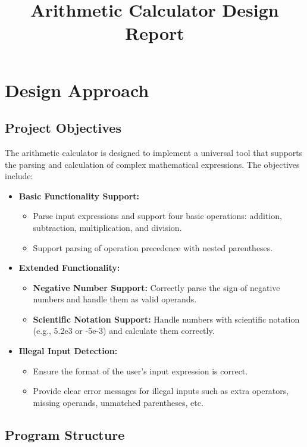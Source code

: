 \documentclass{article}
\title{Arithmetic Calculator Design Report}
\author{}
\date{}
\begin{document}
\maketitle

\section{Design Approach}

\subsection{Project Objectives}

The arithmetic calculator is designed to implement a universal tool that supports the parsing and calculation of complex mathematical expressions. The objectives include:

\begin{itemize}[label=\textbullet]
    \item \textbf{Basic Functionality Support:}
    \begin{itemize}
        \item Parse input expressions and support four basic operations: addition, subtraction, multiplication, and division.
        \item Support parsing of operation precedence with nested parentheses.
    \end{itemize}
    \item \textbf{Extended Functionality:}
    \begin{itemize}
        \item \textbf{Negative Number Support:} Correctly parse the sign of negative numbers and handle them as valid operands.
        \item \textbf{Scientific Notation Support:} Handle numbers with scientific notation (e.g., 5.2e3 or -5e-3) and calculate them correctly.
    \end{itemize}
    \item \textbf{Illegal Input Detection:}
    \begin{itemize}
        \item Ensure the format of the user’s input expression is correct.
        \item Provide clear error messages for illegal inputs such as extra operators, missing operands, unmatched parentheses, etc.
    \end{itemize}
\end{itemize}

\subsection{Program Structure}
\end{document}
